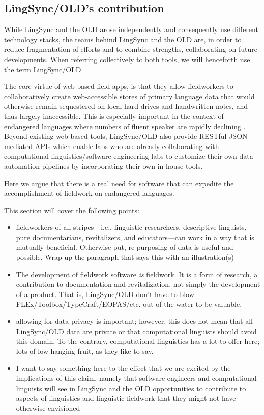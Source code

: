 \documentclass[11pt]{article}
\begin{document}
\subsection{LingSync/OLD's contribution}


While LingSync and the OLD arose independently and consequently use different
technology stacks, the teams behind LingSync and the OLD are, in order to
reduce fragmentation of efforts and to combine strengths, collaborating on
future developments. When referring collectively to both tools, we will
henceforth use the term LingSync/OLD.

The core virtue of web-based field apps, is that they allow fieldworkers to
collaboratively create web-accessible stores of primary language data that
would otherwise remain sequestered on local hard drives and handwritten notes,
and thus largely inaccessible. This is especially important in the context of
endangered languages where numbers of fluent speaker are rapidly declining
\cite{fphlcc10}. Beyond existing web-based tools, LingSync/OLD also
provide RESTful JSON-mediated APIs which enable labs who are already
collaborating with computational linguistics/software engineering labs to
customize their own data automation pipelines by incorporating their own
in-house tools.



Here we argue that there is a real need for software that can expedite the 
accomplishment of fieldwork on endangered languages.

This section will cover the following points:

\begin{itemize}
    \item fieldworkers of all stripes---i.e., linguistic researchers,
        descriptive linguists, pure documentarians, revitalizers, and
        educators---can work in a way that is mutually beneficial.
        Otherwise put, re-purposing of data is useful and possible.
        Wrap up the paragraph that says this with an illustration(s)
    \item The development of fieldwork software \textit{is} fieldwork. It is
        a form of research, a contribution to documentation and revitalization,
        not simply the development of a product. That is, LingSync/OLD don't have
        to blow FLEx/Toolbox/TypeCraft/EOPAS/etc. out of the water to be valuable.
    \item allowing for data privacy is important; however, this does not mean
        that all LingSync/OLD data are private or that computational linguists
        should avoid this domain. To the contrary, computational linguistics has
        a lot to offer here; lots of low-hanging fruit, as they like to say.
    \item I want to say something here to the effect that we are excited by
        the implications of this claim, namely that software engineers and
        computational linguists will see in LingSync and the OLD opportunities
        to contribute to aspects of linguistics and linguistic fieldwork that
        they might not have otherwise envisioned
\end{itemize}
\end{document}
